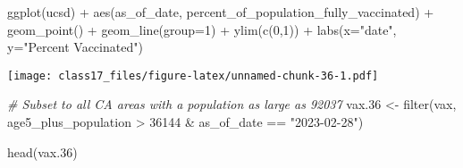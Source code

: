 \documentclass[
]{article}
\newenvironment{Shaded}{\begin{snugshade}}{\end{snugshade}}
\newcommand{\AttributeTok}[1]{\textcolor[rgb]{0.77,0.63,0.00}{#1}}
\newcommand{\CommentTok}[1]{\textcolor[rgb]{0.56,0.35,0.01}{\textit{#1}}}
\newcommand{\DecValTok}[1]{\textcolor[rgb]{0.00,0.00,0.81}{#1}}
\newcommand{\FloatTok}[1]{\textcolor[rgb]{0.00,0.00,0.81}{#1}}
\newcommand{\FunctionTok}[1]{\textcolor[rgb]{0.00,0.00,0.00}{#1}}
\newcommand{\NormalTok}[1]{#1}
\newcommand{\OtherTok}[1]{\textcolor[rgb]{0.56,0.35,0.01}{#1}}
\newcommand{\SpecialCharTok}[1]{\textcolor[rgb]{0.00,0.00,0.00}{#1}}
\newcommand{\StringTok}[1]{\textcolor[rgb]{0.31,0.60,0.02}{#1}}
\begin{document}
\begin{Shaded}
\begin{Highlighting}[]
\FunctionTok{ggplot}\NormalTok{(ucsd) }\SpecialCharTok{+}
  \FunctionTok{aes}\NormalTok{(as\_of\_date,}
\NormalTok{      percent\_of\_population\_fully\_vaccinated) }\SpecialCharTok{+}
  \FunctionTok{geom\_point}\NormalTok{() }\SpecialCharTok{+}
  \FunctionTok{geom\_line}\NormalTok{(}\AttributeTok{group=}\DecValTok{1}\NormalTok{) }\SpecialCharTok{+}
  \FunctionTok{ylim}\NormalTok{(}\FunctionTok{c}\NormalTok{(}\DecValTok{0}\NormalTok{,}\DecValTok{1}\NormalTok{)) }\SpecialCharTok{+}
  \FunctionTok{labs}\NormalTok{(}\AttributeTok{x=}\StringTok{"date"}\NormalTok{, }\AttributeTok{y=}\StringTok{"Percent Vaccinated"}\NormalTok{)}
\end{Highlighting}
\end{Shaded}

\texttt{[image: class17\_files/figure-latex/unnamed-chunk-36-1.pdf]}

\begin{Shaded}
\begin{Highlighting}[]
\CommentTok{\# Subset to all CA areas with a population as large as 92037}
\NormalTok{vax}\FloatTok{.36} \OtherTok{\textless{}{-}} \FunctionTok{filter}\NormalTok{(vax, age5\_plus\_population }\SpecialCharTok{\textgreater{}} \DecValTok{36144} \SpecialCharTok{\&}
\NormalTok{                as\_of\_date }\SpecialCharTok{==} \StringTok{"2023{-}02{-}28"}\NormalTok{)}

\FunctionTok{head}\NormalTok{(vax}\FloatTok{.36}\NormalTok{)}
\end{Highlighting}
\end{Shaded}
\end{document}
